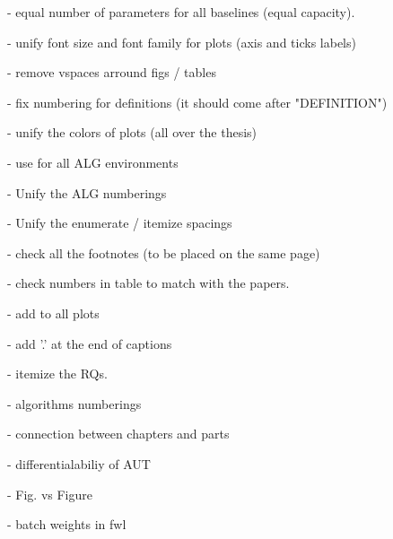  - equal number of parameters for all baselines (equal capacity).

 - unify font size and font family for plots (axis and ticks labels)

 - remove vspaces arround figs / tables
 
 - fix numbering for definitions (it should come after "DEFINITION")
 
 - unify the colors of plots (all over the thesis)
 
 - use \small for all ALG environments
 
 - Unify the ALG numberings
 
 - Unify the enumerate / itemize spacings
 
 - check all the footnotes (to be placed on the same page)
 
 - check numbers in table to match with the papers.
 
 - add \selectfont to all plots
 
 - add '.' at the end of captions
 
 - itemize the RQs.
 
 - algorithms numberings
 
 - connection between chapters and parts
 
 - differentialabiliy of AUT
 
 - Fig. vs Figure
 
 - batch weights in fwl